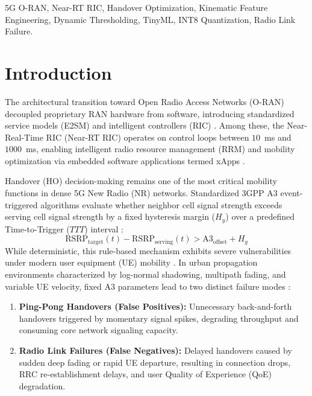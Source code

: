\documentclass[conference]{IEEEtran}
\begin{document}
\begin{IEEEkeywords}
5G O-RAN, Near-RT RIC, Handover Optimization, Kinematic Feature Engineering, Dynamic Thresholding, TinyML, INT8 Quantization, Radio Link Failure.
\end{IEEEkeywords}

\section{Introduction}
The architectural transition toward Open Radio Access Networks (O-RAN) decoupled proprietary RAN hardware from software, introducing standardized service models (E2SM) and intelligent controllers (RIC) \cite{oran_survey_polese}. Among these, the Near-Real-Time RIC (Near-RT RIC) operates on control loops between $10$~ms and $1000$~ms, enabling intelligent radio resource management (RRM) and mobility optimization via embedded software applications termed xApps \cite{oran_intelligence_bonati, oran_ric_dryjanski, oran_spec_wg2}.

Handover (HO) decision-making remains one of the most critical mobility functions in dense 5G New Radio (NR) networks. Standardized 3GPP A3 event-triggered algorithms evaluate whether neighbor cell signal strength exceeds serving cell signal strength by a fixed hysteresis margin ($H_y$) over a predefined Time-to-Trigger ($TTT$) interval \cite{3gpp_spec_38300}:
\begin{equation}
\text{RSRP}_{\text{target}}(t) - \text{RSRP}_{\text{serving}}(t) > \text{A3}_{\text{offset}} + H_y
\end{equation}
While deterministic, this rule-based mechanism exhibits severe vulnerabilities under modern user equipment (UE) mobility \cite{adaptive_ttt_aljubayri}. In urban propagation environments characterized by log-normal shadowing, multipath fading, and variable UE velocity, fixed A3 parameters lead to two distinct failure modes \cite{pingpong_mitigation_lin}:
\begin{enumerate}
    \item \textbf{Ping-Pong Handovers (False Positives):} Unnecessary back-and-forth handovers triggered by momentary signal spikes, degrading throughput and consuming core network signaling capacity.
    \item \textbf{Radio Link Failures (False Negatives):} Delayed handovers caused by sudden deep fading or rapid UE departure, resulting in connection drops, RRC re-establishment delays, and user Quality of Experience (QoE) degradation.
\end{enumerate}
\end{document}
